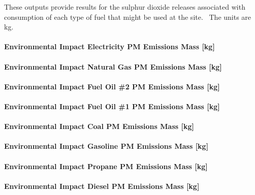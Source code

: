 These outputs provide results for the sulphur dioxide releases associated with consumption of each type of fuel that might be used at the site.~ The units are kg.

\paragraph{Environmental Impact Electricity PM Emissions Mass {[}kg{]}}\label{environmental-impact-electricity-pm-emissions-mass-kg}

\paragraph{Environmental Impact Natural Gas PM Emissions Mass {[}kg{]}}\label{environmental-impact-natural-gas-pm-emissions-mass-kg}

\paragraph{Environmental Impact Fuel Oil \#2 PM Emissions Mass {[}kg{]}}\label{environmental-impact-fuel-oil-2-pm-emissions-mass-kg}

\paragraph{Environmental Impact Fuel Oil \#1 PM Emissions Mass {[}kg{]}}\label{environmental-impact-fuel-oil-1-pm-emissions-mass-kg}

\paragraph{Environmental Impact Coal PM Emissions Mass {[}kg{]}}\label{environmental-impact-coal-pm-emissions-mass-kg}

\paragraph{Environmental Impact Gasoline PM Emissions Mass {[}kg{]}}\label{environmental-impact-gasoline-pm-emissions-mass-kg}

\paragraph{Environmental Impact Propane PM Emissions Mass {[}kg{]}}\label{environmental-impact-propane-pm-emissions-mass-kg}

\paragraph{Environmental Impact Diesel PM Emissions Mass {[}kg{]}}\label{environmental-impact-diesel-pm-emissions-mass-kg}

